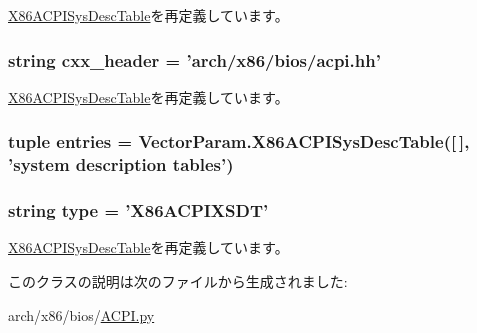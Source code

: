 \hyperlink{classACPI_1_1X86ACPISysDescTable_a58cd55cd4023648e138237cfc0822ae3}{X86ACPISysDescTable}を再定義しています。\hypertarget{classACPI_1_1X86ACPIXSDT_a17da7064bc5c518791f0c891eff05fda}{
\subsubsection[{cxx\_\-header}]{\setlength{\rightskip}{0pt plus 5cm}string {\bf cxx\_\-header} = 'arch/x86/bios/acpi.hh'}}
\label{classACPI_1_1X86ACPIXSDT_a17da7064bc5c518791f0c891eff05fda}


\hyperlink{classACPI_1_1X86ACPISysDescTable_a17da7064bc5c518791f0c891eff05fda}{X86ACPISysDescTable}を再定義しています。\hypertarget{classACPI_1_1X86ACPIXSDT_aa7b3bf5cf82e2cb9b7cea7a35c454576}{
\subsubsection[{entries}]{\setlength{\rightskip}{0pt plus 5cm}tuple {\bf entries} = VectorParam.X86ACPISysDescTable(\mbox{[}$\,$\mbox{]}, 'system description tables')}}
\label{classACPI_1_1X86ACPIXSDT_aa7b3bf5cf82e2cb9b7cea7a35c454576}
\hypertarget{classACPI_1_1X86ACPIXSDT_acce15679d830831b0bbe8ebc2a60b2ca}{
\subsubsection[{type}]{\setlength{\rightskip}{0pt plus 5cm}string {\bf type} = '{\bf X86ACPIXSDT}'}}
\label{classACPI_1_1X86ACPIXSDT_acce15679d830831b0bbe8ebc2a60b2ca}


\hyperlink{classACPI_1_1X86ACPISysDescTable_acce15679d830831b0bbe8ebc2a60b2ca}{X86ACPISysDescTable}を再定義しています。

このクラスの説明は次のファイルから生成されました:\begin{DoxyCompactItemize}
\item 
arch/x86/bios/\hyperlink{ACPI_8py}{ACPI.py}\end{DoxyCompactItemize}
